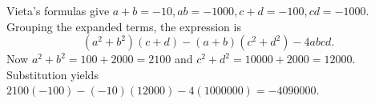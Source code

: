 Vieta's formulas give $a+b=-10,ab=-1000,c+d=-100,cd=-1000$. Grouping the expanded terms, the expression is
\[(a^2+b^2)(c+d)-(a+b)(c^2+d^2)-4abcd.\]
Now $a^2+b^2=100+2000=2100$ and $c^2+d^2=10000+2000=12000$. Substitution yields $2100(-100)-(-10)(12000)-4(1000000)=\boxed{-4090000}$.
